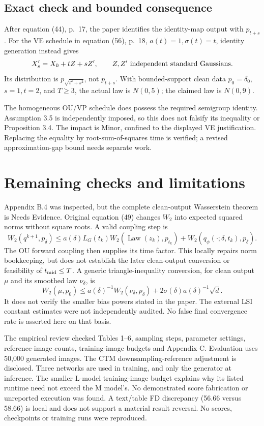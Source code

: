 \documentclass[10pt]{article}
\begin{document}
\subsection*{Exact check and bounded consequence}
After equation (44), p. 17, the paper identifies the identity-map output with \(p_{t+s}\). For the VE schedule in equation (56), p. 18, \(a(t)=1,\sigma(t)=t\), identity generation instead gives \[X_s'=X_0+tZ+sZ',\qquad Z,Z'\ \hbox{independent standard Gaussians}.\] Its distribution is \(p_{\sqrt{t^2+s^2}}\), not \(p_{t+s}\). With bounded-support clean data \(p_0=\delta_0\), \(s=1,t=2\), and \(T\geq3\), the actual law is \(N(0,5)\); the claimed law is \(N(0,9)\).\par
The homogeneous OU/VP schedule does possess the required semigroup identity. Assumption 3.5 is independently imposed, so this does not falsify its inequality or Proposition 3.4. The impact is Minor, confined to the displayed VE justification. Replacing the equality by root-sum-of-squares time is verified; a revised approximation-gap bound needs separate work.\par
\section*{Remaining checks and limitations}
Appendix B.4 was inspected, but the complete clean-output Wasserstein theorem is Needs Evidence. Original equation (49) changes \(W_2\) into expected squared norms without square roots. A valid coupling step is \[W_2(q^{k+1},p_\delta)
 \leq a(\delta)L_G(t_k)W_2(\operatorname{Law}(z_k),p_{t_k})
      +W_2(q_\phi(\cdot;\delta,t_k),p_\delta).\] The OU forward coupling then supplies its time factor. This locally repairs norm bookkeeping, but does not establish the later clean-output conversion or feasibility of \(t_{\rm mid}\leq T\). A generic triangle-inequality conversion, for clean output \(\mu\) and its smoothed law \(\nu_\delta\), is \[W_2(\mu,p_0)\leq a(\delta)^{-1}W_2(\nu_\delta,p_\delta)
                  +2\sigma(\delta)a(\delta)^{-1}\sqrt d.\] It does not verify the smaller bias powers stated in the paper. The external LSI constant estimates were not independently audited. No false final convergence rate is asserted here on that basis.\par
The empirical review checked Tables 1–6, sampling steps, parameter settings, reference-image counts, training-image budgets and Appendix C. Evaluation uses 50,000 generated images. The CTM downsampling-reference adjustment is disclosed. Three networks are used in training, and only the generator at inference. The smaller L-model training-image budget explains why its listed runtime need not exceed the M model’s. No demonstrated score fabrication or unreported execution was found. A text/table FD discrepancy (56.66 versus 58.66) is local and does not support a material result reversal. No scores, checkpoints or training runs were reproduced.\par
\end{document}
